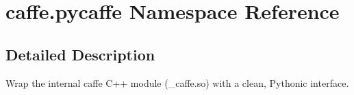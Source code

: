 \hypertarget{namespacecaffe_1_1pycaffe}{}\section{caffe.\+pycaffe Namespace Reference}
\label{namespacecaffe_1_1pycaffe}


\subsection{Detailed Description}
\begin{DoxyVerb}Wrap the internal caffe C++ module (_caffe.so) with a clean, Pythonic
interface.
\end{DoxyVerb}
 